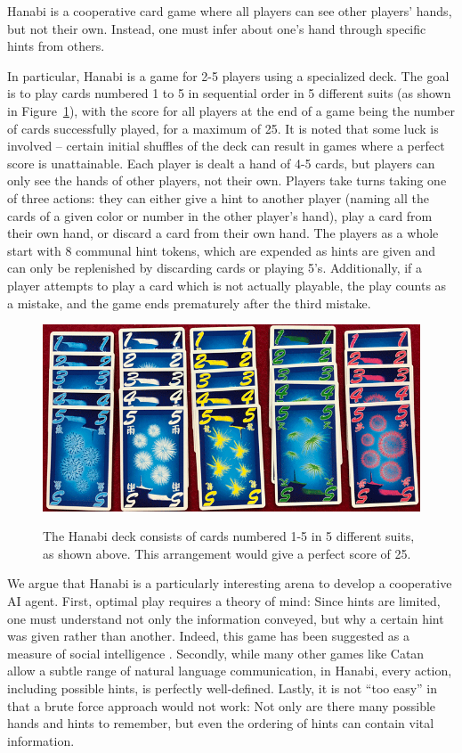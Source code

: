 \documentclass{article}
\begin{document}
Hanabi is a cooperative card game where all players can see other players' hands, but not their own. Instead, one must infer about one's hand through specific hints from others.

In particular, Hanabi is a game for 2-5 players using a specialized deck. The goal is to play cards numbered 1 to 5 in sequential order in 5 different suits (as shown in Figure~\ref{fig:cards}), with the score for all players at the end of a game being the number of cards successfully played, for a maximum of 25. It is noted that some luck is involved -- certain initial shuffles of the deck can result in games where a perfect score is unattainable. Each player is dealt a hand of 4-5 cards, but players can only see the hands of other players, not their own. Players take turns taking one of three actions: they can either give a hint to another player (naming all the cards of a given color or number in the other player's hand), play a card from their own hand, or discard a card from their own hand. The players as a whole start with 8 communal hint tokens, which are expended as hints are given and can only be replenished by discarding cards or playing 5’s. Additionally, if a player attempts to play a card which is not actually playable, the play counts as a mistake, and the game ends prematurely after the third mistake.

\begin{figure}
  \includegraphics[width=\columnwidth]{cards}
  \label{fig:cards}
  \caption{The Hanabi deck consists of cards numbered 1-5 in 5 different suits, as shown above. This arrangement would give a perfect score of 25.}
\end{figure}

We argue that Hanabi is a particularly interesting arena to develop a cooperative AI agent. First, optimal play requires a theory of mind: Since hints are limited, one must understand not only the information conveyed, but why a certain hint was given rather than another. Indeed, this game has been suggested as a measure of social intelligence \cite{osawa15}. Secondly, while many other games like Catan allow a subtle range of natural language communication, in Hanabi, every action, including possible hints, is perfectly well-defined. Lastly, it is not ``too easy'' in that a brute force approach would not work: Not only are there many possible hands and hints to remember, but even the ordering of hints can contain vital information.
\end{document}
